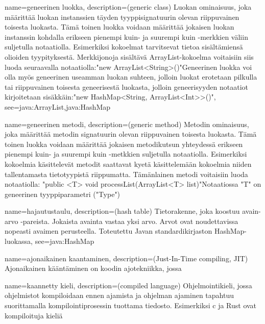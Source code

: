 {
	name=geneerinen luokka,
	description={(generic class) Luokan ominaisuus, joka määrittää luokan instanssien täyden
tyyppisignatuurin olevan riippuvainen toisesta luokasta. Tämä toinen luokka voidaan määrittää
jokaisen luokan instanssin kohdalla erikseen pienempi kuin- ja suurempi kuin -merkkien väliin
suljetulla notaatiolla. Esimerkiksi kokoelmat tarvitsevat tietoa sisältämiensä olioiden
tyypityksestä. Merkkijonoja sisältävä ArrayList-kokoelma voitaisiin siis luoda seuraavalla 
notaatiolla:\newline{}"new ArrayList<String>()"\newline{}Geneerinen luokka voi olla myös
geneerinen useamman luokan suhteen, jolloin luokat erotetaan pilkulla tai riippuvainen toisesta
geneerisestä luokasta, jolloin geneerisyyden notaatiot kirjoitetaan
sisäkkäin:\newline{}"new HashMap<String, ArrayList<Int>>()"},
	see={java:ArrayList,java:HashMap}
}

{
	name=geneerinen metodi,
	description={(generic method) Metodin ominaisuus, joka määrittää metodin signatuurin olevan
riippuvainen toisesta luokasta. Tämä toinen luokka voidaan määrittää jokaisen metodikutsun
yhteydessä erikseen pienempi kuin- ja suurempi kuin -metkkien suljetulla notaatiolla. Esimerkiksi
kokoelmia käsittelevät metodit saattavat kyetä käsittelemään kokoelmia niiden tallentamasta
tietotyypistä riippumatta. Tämänlainen metodi voitaisiin luoda notaatiolla:\newline{}
"public <T> void processList(ArrayList<T> list)"\newline{}Notaatiossa "T" on geneerinen
tyyppiparametri ("Type")}
}

{
	name=hajautustaulu,
	description={(hash table) Tietorakenne, joka koostuu avain-arvo -pareista. Jokaista avainta
vastaa yksi arvo. Arvot ovat noudettavissa nopeasti avaimen perusteella. Toteutettu Javan
standardikirjaston HashMap-luokassa},
	see={java:HashMap}
}

{
	name=ajonaikainen kaantaminen,
	description={(Just-In-Time compiling, JIT) Ajonaikainen kääntäminen on koodin ajotekniikka,
jossa}
}


{
	name=kaannetty kieli,
	description={(compiled language) Ohjelmointikieli, jossa ohjelmistot kompiloidaan ennen
ajamista ja ohjelman ajaminen tapahtuu suorittamalla kompilointiprosessin tuottama tiedosto.
Esimerkiksi c ja Rust ovat kompiloituja kieliä}
}


